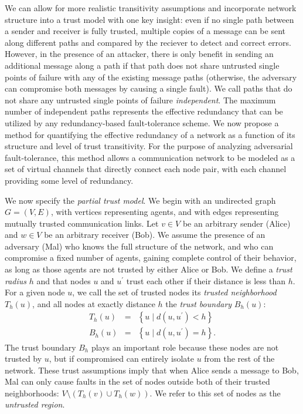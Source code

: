 \documentclass{sig-alternate-05-2015}
\newcommand{\beq}{\begin{eqnarray}}
\newcommand{\eeq}{\end{eqnarray}}
\begin{document}
We can allow for more realistic transitivity assumptions and incorporate
network structure into a trust model with one key insight:
even if no single path between a sender and receiver is fully trusted,
multiple copies of a message can be sent along different paths and compared
by the reciever to detect and correct errors.
However, in the presence of an attacker, there is only benefit in sending an
additional message along a path if that path does not share untrusted
single points of failure with any of the existing message paths
(otherwise, the adversary can compromise both messages
by causing a single fault).
We call paths that do not share any untrusted single points of failure
{\em independent}.
The maximum number of independent paths represents the effective redundancy that
can be utilized by any redundancy-based fault-tolerance scheme.
We now propose a method for quantifying the effective redundancy of a network
as a function of its structure and level of trust transitivity.
For the purpose of analyzing adversarial fault-tolerance,
this method allows a communication network
to be modeled as a set of virtual channels that directly
connect each node pair,
with each channel providing some level of redundancy.

We now specify the {\em partial trust model}.
We begin with an undirected graph $G = (V,E)$,
with vertices representing agents,
and with edges representing mutually trusted communication links.
Let $v \in V$ be an arbitrary sender (Alice)
and $w \in V$ be an arbitrary receiver (Bob).
We assume the presence of an adversary (Mal) who knows the
full structure of the network,
and who can compromise a fixed number of agents,
gaining complete control of their behavior,
as long as those agents are not trusted by either Alice or Bob.
We define a {\em trust radius} $h$ and that nodes $u$ and
$u^\prime$ trust each other if their distance is less than $h$.
For a given node $u$,
we call the set of trusted nodes its
{\em trusted neighborhood} $T_h(u)$,
and all nodes at exactly distance $h$ the
{\em trust boundary} $B_h(u)$:
\beq
T_h(u) &=& \left\{ u \mid d(u,u^\prime) < h \right\} \\
B_h(u) &=& \left\{ u \mid d(u,u^\prime) = h \right\}.
\eeq
The trust boundary $B_h$ plays an important role because these nodes are not
trusted by $u$,
but if compromised can entirely isolate $u$ from the rest of the network.
These trust assumptions imply that when Alice sends a message to Bob,
Mal can only cause faults in the set of nodes outside both of their trusted
neighborhoods: $V \setminus \left(T_h(v) \cup T_h(w)\right)$.
We refer to this set of nodes as the {\em untrusted region}.
\end{document}
